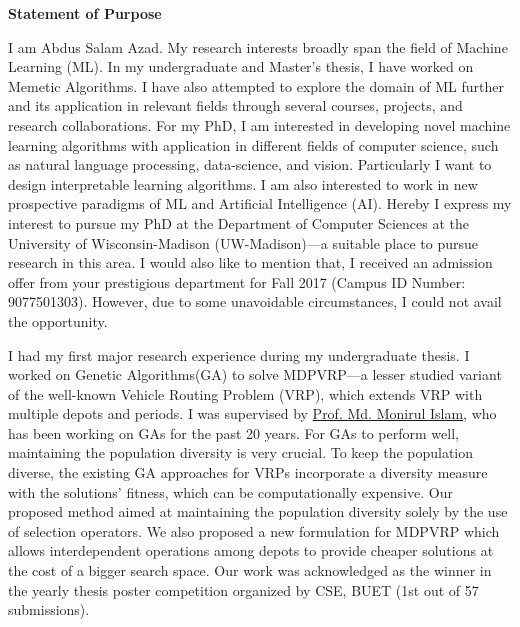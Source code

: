 \documentclass[12pt]{article}
\begin{document}


\fancyhf{}
\rfoot{\thepage}

\begin{center}
{\LARGE \bf 
Statement of Purpose}\\
\end{center}



I am Abdus Salam Azad. My research interests broadly span the field of Machine Learning (ML). In my undergraduate and Master's thesis, I have worked on Memetic Algorithms. I have also attempted to explore the domain of ML further and its application in relevant fields through several courses, projects, and research collaborations. For my PhD, I am interested in developing novel machine learning algorithms with application in different fields of computer science, such as natural language processing, data-science, and vision. Particularly I want to design interpretable learning algorithms. I am also interested to work in new prospective paradigms of ML and Artificial Intelligence (AI). Hereby I express my interest to pursue my PhD at the Department of Computer Sciences at the University of Wisconsin-Madison (UW-Madison)---a suitable place to pursue research in this area. I would also like to mention that, I received an admission offer from your prestigious department for Fall 2017 (Campus ID Number: 9077501303). However, due to some unavoidable circumstances, I could not avail the opportunity. 

I had my first major research experience during my undergraduate thesis. I worked on Genetic Algorithms(GA) to solve MDPVRP---a lesser studied variant of the well-known Vehicle Routing Problem (VRP), which extends VRP with multiple depots and periods. I was supervised by \href{http://cse.buet.ac.bd/faculty/facdetail.php?id=mdmonirulislam}{Prof. Md. Monirul Islam}, who has been working on GAs for the past 20 years. For GAs to perform well, maintaining the population diversity is very crucial. To keep the population diverse, the existing GA approaches for VRPs incorporate a diversity measure with the solutions' fitness, which can be computationally expensive. Our proposed method aimed at maintaining the population diversity solely by the use of selection operators. We also proposed a new formulation for MDPVRP which allows interdependent operations among depots to provide cheaper solutions at the cost of a bigger search space. Our work was acknowledged as the winner in the yearly thesis poster competition organized by CSE, BUET (1st out of 57 submissions).
\end{document}
